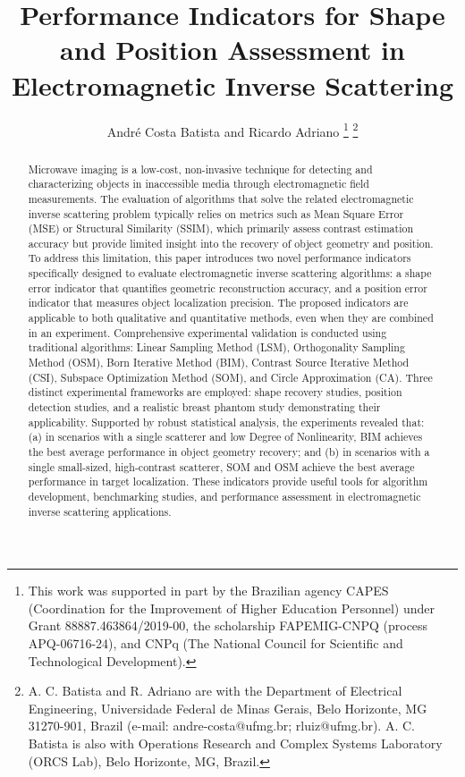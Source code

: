 \documentclass{IEEEtran}
\begin{document}
    \title{Performance Indicators for Shape and Position Assessment in Electromagnetic Inverse Scattering}
    \author{Andr\'e Costa Batista and Ricardo Adriano
    \thanks{This work was supported in part by the Brazilian agency CAPES (Coordination for the Improvement of Higher Education Personnel) under Grant 88887.463864/2019-00, the scholarship FAPEMIG-CNPQ (process APQ-06716-24), and CNPq (The National Council for Scientific and Technological Development).}
    \thanks{A. C. Batista and R. Adriano are with the Department of Electrical Engineering, Universidade Federal de Minas Gerais, Belo Horizonte, MG 31270-901, Brazil (e-mail: andre-costa@ufmg.br; rluiz@ufmg.br). A. C. Batista is also with Operations Research and Complex Systems Laboratory (ORCS Lab), Belo Horizonte, MG, Brazil.}}
   
    \maketitle
    
    \begin{abstract}
        Microwave imaging is a low-cost, non-invasive technique for detecting and characterizing objects in inaccessible media through electromagnetic field measurements. The evaluation of algorithms that solve the related electromagnetic inverse scattering problem typically relies on metrics such as Mean Square Error (MSE) or Structural Similarity (SSIM), which primarily assess contrast estimation accuracy but provide limited insight into the recovery of object geometry and position. To address this limitation, this paper introduces two novel performance indicators specifically designed to evaluate electromagnetic inverse scattering algorithms: a shape error indicator that quantifies geometric reconstruction accuracy, and a position error indicator that measures object localization precision. The proposed indicators are applicable to both qualitative and quantitative methods, even when they are combined in an experiment. Comprehensive experimental validation is conducted using traditional algorithms: Linear Sampling Method (LSM), Orthogonality Sampling Method (OSM), Born Iterative Method (BIM), Contrast Source Iterative Method (CSI), Subspace Optimization Method (SOM), and Circle Approximation (CA). Three distinct experimental frameworks are employed: shape recovery studies, position detection studies, and a realistic breast phantom study demonstrating their applicability. Supported by robust statistical analysis, the experiments revealed that: (a) in scenarios with a single scatterer and low Degree of Nonlinearity, BIM achieves the best average performance in object geometry recovery; and (b) in scenarios with a single small-sized, high-contrast scatterer, SOM and OSM achieve the best average performance in target localization. These indicators provide useful tools for algorithm development, benchmarking studies, and performance assessment in electromagnetic inverse scattering applications.
        
    \end{abstract}
    
\end{document}
